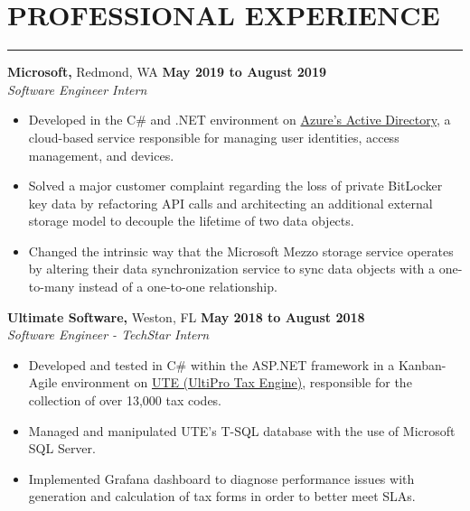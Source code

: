 \documentclass[11pt]{article} %
\begin{document}
	\section*{PROFESSIONAL EXPERIENCE}
		\hrule \relax
		\vspace{.4cm}
		
		\noindent \textbf{Microsoft,} Redmond, WA \hfill\textbf{May 2019 to August 2019}\\
		\textit{Software Engineer Intern}
		\begin{itemize}[noitemsep,nolistsep, label = {-}]
			\item Developed in the C\# and .NET environment on \href{https://docs.microsoft.com/en-us/azure/active-directory/fundamentals/active-directory-whatis}{Azure's Active Directory}, a cloud-based service responsible for managing user identities, access management, and devices.
			\item Solved a major customer complaint regarding the loss of private BitLocker key data by refactoring API calls and architecting an additional external storage model to decouple the lifetime of two data objects.
			\item Changed the intrinsic way that the Microsoft Mezzo storage service operates by altering their data synchronization service to sync data objects with a one-to-many instead of a one-to-one relationship.
		\end{itemize}
	
		\vspace{.20cm}
		
		\noindent \textbf{Ultimate Software,} Weston, FL \hfill\textbf{May 2018 to August 2018}\\
		\textit{Software Engineer - TechStar Intern}
		\begin{itemize}[noitemsep,nolistsep, label = {-}]
			\item Developed and tested in C\# within the ASP.NET framework in a Kanban-Agile environment on \href{https://www.ultimatesoftware.com/UltiPro-Solution-Features-Payment-Services}{UTE (UltiPro Tax Engine)}, responsible for the collection of over 13,000 tax codes.
			\item Managed and manipulated UTE's T-SQL database with the use of Microsoft SQL Server.
			\item Implemented Grafana dashboard to diagnose performance issues with generation and calculation of tax forms in order to better meet SLAs.
		\end{itemize}
		\vspace{.20cm}
		
\end{document}
